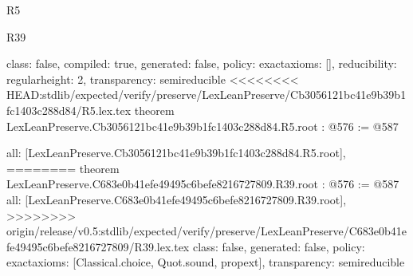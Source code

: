 \begin{lexlean}{R5}
\begin{lexlean}{R39}
\begin{coremodule}
{{{{{  class: false,
  compiled: true,
  generated: false,
  policy: exact{axioms: []},
  reducibility: regular{height: 2},
  transparency: semireducible
}
<<<<<<<< HEAD:stdlib/expected/verify/preserve/LexLeanPreserve/Cb3056121bc41e9b39b1fc1403c288d84/R5.lex.tex
theorem LexLeanPreserve.Cb3056121bc41e9b39b1fc1403c288d84.R5.root : @576 := @587 {
  all: [LexLeanPreserve.Cb3056121bc41e9b39b1fc1403c288d84.R5.root],
========
theorem LexLeanPreserve.C683e0b41efe49495c6befe8216727809.R39.root : @576 := @587 {
  all: [LexLeanPreserve.C683e0b41efe49495c6befe8216727809.R39.root],
>>>>>>>> origin/release/v0.5:stdlib/expected/verify/preserve/LexLeanPreserve/C683e0b41efe49495c6befe8216727809/R39.lex.tex
  class: false,
  generated: false,
  policy: exact{axioms: [Classical.choice, Quot.sound, propext]},
  transparency: semireducible
}

}}}}}
\end{coremodule}
\end{lexlean}
\end{lexlean}
